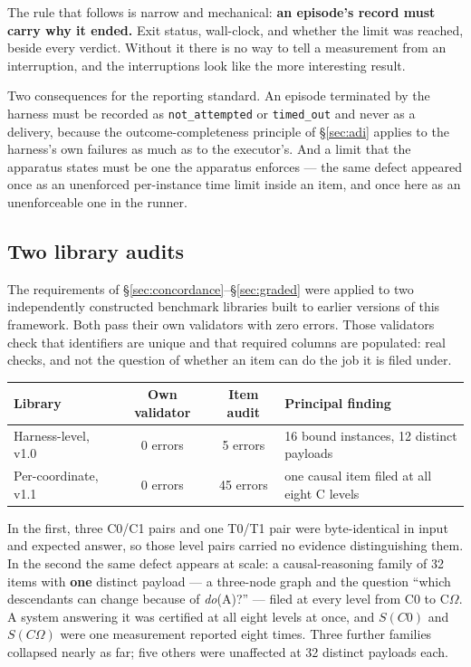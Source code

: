 \documentclass[11pt]{article}
\theoremstyle{definition}
\newcommand{\Om}{\ensuremath{\Omega}}
\begin{document}
The rule that follows is narrow and mechanical: \textbf{an episode's record must carry why it ended.} Exit status, wall-clock, and whether the limit was reached, beside every verdict. Without it there is no way to tell a measurement from an interruption, and the interruptions look like the more interesting result.

Two consequences for the reporting standard. An episode terminated by the harness must be recorded as \texttt{not\_attempted} or \texttt{timed\_out} and never as a delivery, because the outcome-completeness principle of \S\ref{sec:adi} applies to the harness's own failures as much as to the executor's. And a limit that the apparatus states must be one the apparatus enforces --- the same defect appeared once as an unenforced per-instance time limit inside an item, and once here as an unenforceable one in the runner.

\subsection{Two library audits}\label{sec:libraries}

The requirements of \S\ref{sec:concordance}--\S\ref{sec:graded} were applied to two independently constructed benchmark libraries built to earlier versions of this framework. Both pass their own validators with zero errors. Those validators check that identifiers are unique and that required columns are populated: real checks, and not the question of whether an item can do the job it is filed under.

\begin{table}[h]
\centering\small
\begin{tabularx}{\textwidth}{@{}lccY@{}}
\toprule
Library & Own validator & Item audit & Principal finding \\
\midrule
Harness-level, v1.0 & 0 errors & 5 errors & 16 bound instances, 12 distinct payloads \\
Per-coordinate, v1.1 & 0 errors & 45 errors & one causal item filed at all eight C levels \\
\bottomrule
\end{tabularx}
\end{table}

In the first, three C0/C1 pairs and one T0/T1 pair were byte-identical in input and expected answer, so those level pairs carried no evidence distinguishing them. In the second the same defect appears at scale: a causal-reasoning family of 32 items with \textbf{one} distinct payload --- a three-node graph and the question ``which descendants can change because of \emph{do}(A)?'' --- filed at every level from C0 to C\Om{}. A system answering it was certified at all eight levels at once, and $S(C0)$ and $S(C\Om{})$ were one measurement reported eight times. Three further families collapsed nearly as far; five others were unaffected at 32 distinct payloads each.
\end{document}
